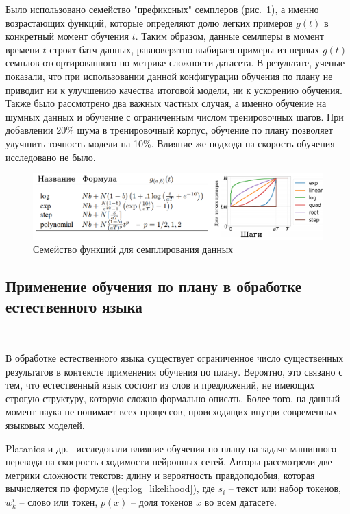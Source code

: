 \documentclass{spbau-diploma}
\begin{document}
Было использовано семейство "префиксных" семплеров (рис.~\ref{fig:cv_pacing_functions}), а именно возрастающих функций, которые определяют долю легких примеров $g(t)$ в конкретный момент обучения $t$. Таким образом, данные семлперы в момент времени $t$ строят батч данных, равноверятно выбираея примеры из первых $g(t)$ семплов отсортированного по метрике сложности датасета. В результате, ученые показали, что при использовании данной конфигурации обучения по плану не приводит ни к улучшению качества итоговой модели, ни к ускорению обучения. Также было рассмотрено два важных частных случая, а именно обучение на шумных данных и обучение с ограниченным числом тренировочных шагов. При добавлении 20\% шума в тренировочный корпус, обучение по плану позволяет улучшить точность модели на 10\%. Влияние же подхода на скорость обучения исследовано не было.

\begin{figure}[h]
	\centering
	\includegraphics[scale=0.48]{CV_pacing_functions}
	\caption{Семейство функций для семплирования данных}
	\label{fig:cv_pacing_functions}
\end{figure}

\subsection{Применение обучения по плану в обработке естественного языка}
\ 

В обработке естественного языка существует ограниченное число существенных результатов в контексте применения обучения по плану. Вероятно, это связано с тем, что естественный язык состоит из слов и предложений, не имеющих строгую структуру, которую сложно формально описать. Более того, на данный момент наука не понимает всех процессов, происходящих внутри современных языковых моделей.

Platanios и др.~\cite{platanios2019competence} исследовали влияние обучения по плану на задаче машинного перевода на скосрость сходимости нейронных сетей. Авторы рассмотрели две метрики сложности текстов: длину и вероятность правдоподобия, которая вычисляется по формуле (\ref{eq:log_likelihood}), где $s_i$ -- текст или набор токенов, $w_k^i$ -- слово или токен, $p(x)$ -- доля токенов $x$ во всем датасете.
\end{document}
